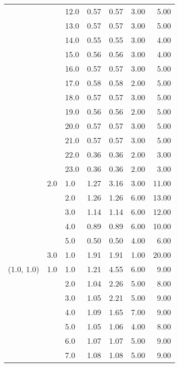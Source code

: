 \begin{tabular}{lllrrrr}
           &     & 12.0 &       0.57 &      0.57 & 3.00 &   5.00 \\
           &     & 13.0 &       0.57 &      0.57 & 3.00 &   5.00 \\
           &     & 14.0 &       0.55 &      0.55 & 3.00 &   4.00 \\
           &     & 15.0 &       0.56 &      0.56 & 3.00 &   4.00 \\
           &     & 16.0 &       0.57 &      0.57 & 3.00 &   5.00 \\
           &     & 17.0 &       0.58 &      0.58 & 2.00 &   5.00 \\
           &     & 18.0 &       0.57 &      0.57 & 3.00 &   5.00 \\
           &     & 19.0 &       0.56 &      0.56 & 2.00 &   5.00 \\
           &     & 20.0 &       0.57 &      0.57 & 3.00 &   5.00 \\
           &     & 21.0 &       0.57 &      0.57 & 3.00 &   5.00 \\
           &     & 22.0 &       0.36 &      0.36 & 2.00 &   3.00 \\
           &     & 23.0 &       0.36 &      0.36 & 2.00 &   3.00 \\
           & 2.0 & 1.0  &       1.27 &      3.16 & 3.00 &  11.00 \\
           &     & 2.0  &       1.26 &      1.26 & 6.00 &  13.00 \\
           &     & 3.0  &       1.14 &      1.14 & 6.00 &  12.00 \\
           &     & 4.0  &       0.89 &      0.89 & 6.00 &  10.00 \\
           &     & 5.0  &       0.50 &      0.50 & 4.00 &   6.00 \\
           & 3.0 & 1.0  &       1.91 &      1.91 & 1.00 &  20.00 \\
(1.0, 1.0) & 1.0 & 1.0  &       1.21 &      4.55 & 6.00 &   9.00 \\
           &     & 2.0  &       1.04 &      2.26 & 5.00 &   8.00 \\
           &     & 3.0  &       1.05 &      2.21 & 5.00 &   9.00 \\
           &     & 4.0  &       1.09 &      1.65 & 7.00 &   9.00 \\
           &     & 5.0  &       1.05 &      1.06 & 4.00 &   8.00 \\
           &     & 6.0  &       1.07 &      1.07 & 5.00 &   9.00 \\
           &     & 7.0  &       1.08 &      1.08 & 5.00 &   9.00 \\

\end{tabular}
